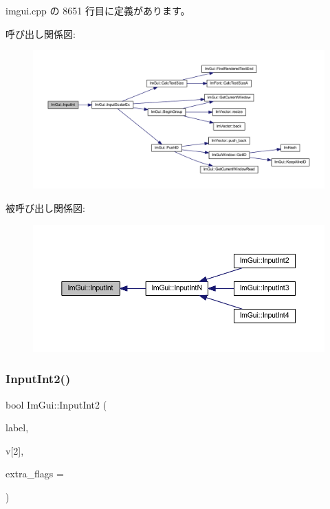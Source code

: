  imgui.\+cpp の 8651 行目に定義があります。

呼び出し関係図\+:\nopagebreak
\begin{figure}[H]
\begin{center}
\leavevmode
\includegraphics[width=350pt]{namespace_im_gui_a8b5e9de08c18d6053d2f718b99be94a6_cgraph}
\end{center}
\end{figure}
被呼び出し関係図\+:\nopagebreak
\begin{figure}[H]
\begin{center}
\leavevmode
\includegraphics[width=350pt]{namespace_im_gui_a8b5e9de08c18d6053d2f718b99be94a6_icgraph}
\end{center}
\end{figure}
\mbox{\label{namespace_im_gui_a4142cc4545d789d76d51dee61c959a03}} 
\subsubsection{\texorpdfstring{Input\+Int2()}{InputInt2()}}
{\footnotesize\ttfamily bool Im\+Gui\+::\+Input\+Int2 (\begin{DoxyParamCaption}\item[{const char $\ast$}]{label,  }\item[{int}]{v\mbox{[}2\mbox{]},  }\item[{\mbox{\hyperlink{imgui_8h_a7d2c6153a6b9b5d3178ce82434ac9fb8}{Im\+Gui\+Input\+Text\+Flags}}}]{extra\+\_\+flags = {} }\end{DoxyParamCaption})}



